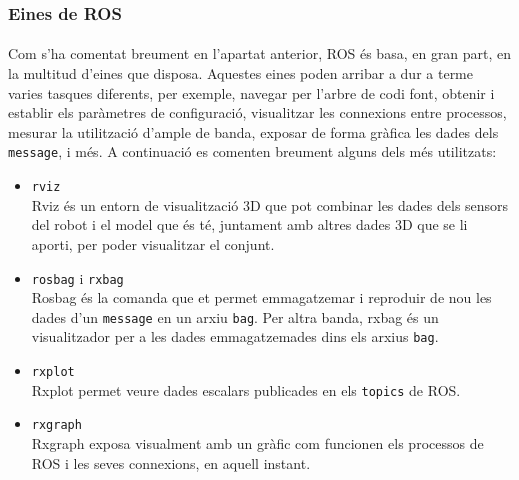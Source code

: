 \documentclass[12pt,a4paper,final,twoside]{article}
\begin{document}
\subsubsection{Eines de ROS}
\paragraph{}Com s'ha comentat breument en l'apartat anterior, ROS és basa, en gran part, en la multitud d'eines que disposa. Aquestes eines poden arribar a dur a terme varies tasques diferents, per exemple, navegar per l'arbre de codi font, obtenir i establir els paràmetres de configuració, visualitzar les connexions entre processos, mesurar la utilització d'ample de banda, exposar de forma gràfica les dades dels \texttt{message}, i més. A continuació es comenten breument alguns dels més utilitzats:
\begin{itemize}
\item \texttt{rviz}\\
Rviz és un entorn de visualització 3D que pot combinar les dades dels sensors del robot i el model que és té, juntament amb altres dades 3D que se li aporti, per poder visualitzar el conjunt.

\item \texttt{rosbag} i \texttt{rxbag}\\
Rosbag és la comanda que et permet emmagatzemar i reproduir de nou les dades d'un \texttt{message} en un arxiu \texttt{bag}. Per altra banda, rxbag és un visualitzador per a les dades emmagatzemades dins els arxius \texttt{bag}.

\item \texttt{rxplot}\\
Rxplot permet veure dades escalars publicades en els \texttt{topics} de ROS.

\item \texttt{rxgraph}\\
Rxgraph exposa visualment amb un gràfic com funcionen els processos de ROS i les seves connexions, en aquell instant.

\end{itemize}

\end{document}
